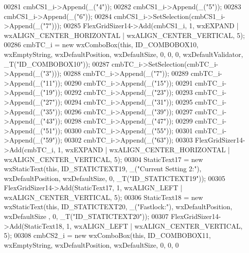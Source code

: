 \begin{DoxyCode}
00281     cmbCS1\_i->Append(\_(\textcolor{stringliteral}{"4"}));
00282     cmbCS1\_i->Append(\_(\textcolor{stringliteral}{"5"}));
00283     cmbCS1\_i->Append(\_(\textcolor{stringliteral}{"6"}));
00284     cmbCS1\_i->SetSelection(cmbCS1\_i->Append(\_(\textcolor{stringliteral}{"7"})));
00285     FlexGridSizer14->Add(cmbCS1\_i, 1, wxEXPAND | wxALIGN\_CENTER\_HORIZONTAL | wxALIGN\_CENTER\_VERTICAL, 5);
00286     cmbTC\_i = \textcolor{keyword}{new} wxComboBox(\textcolor{keyword}{this}, ID\_COMBOBOX10, wxEmptyString, wxDefaultPosition, wxDefaultSize, 0, 0, 0,
       wxDefaultValidator, _T(\textcolor{stringliteral}{"ID\_COMBOBOX10"}));
00287     cmbTC\_i->SetSelection(cmbTC\_i->Append(\_(\textcolor{stringliteral}{"3"})));
00288     cmbTC\_i->Append(\_(\textcolor{stringliteral}{"7"}));
00289     cmbTC\_i->Append(\_(\textcolor{stringliteral}{"11"}));
00290     cmbTC\_i->Append(\_(\textcolor{stringliteral}{"15"}));
00291     cmbTC\_i->Append(\_(\textcolor{stringliteral}{"19"}));
00292     cmbTC\_i->Append(\_(\textcolor{stringliteral}{"23"}));
00293     cmbTC\_i->Append(\_(\textcolor{stringliteral}{"27"}));
00294     cmbTC\_i->Append(\_(\textcolor{stringliteral}{"31"}));
00295     cmbTC\_i->Append(\_(\textcolor{stringliteral}{"35"}));
00296     cmbTC\_i->Append(\_(\textcolor{stringliteral}{"39"}));
00297     cmbTC\_i->Append(\_(\textcolor{stringliteral}{"43"}));
00298     cmbTC\_i->Append(\_(\textcolor{stringliteral}{"47"}));
00299     cmbTC\_i->Append(\_(\textcolor{stringliteral}{"51"}));
00300     cmbTC\_i->Append(\_(\textcolor{stringliteral}{"55"}));
00301     cmbTC\_i->Append(\_(\textcolor{stringliteral}{"59"}));
00302     cmbTC\_i->Append(\_(\textcolor{stringliteral}{"63"}));
00303     FlexGridSizer14->Add(cmbTC\_i, 1, wxEXPAND | wxALIGN\_CENTER\_HORIZONTAL | wxALIGN\_CENTER\_VERTICAL, 5);
00304     StaticText17 = \textcolor{keyword}{new} wxStaticText(\textcolor{keyword}{this}, ID\_STATICTEXT19, \_(\textcolor{stringliteral}{"Current Setting 2:"}), wxDefaultPosition, 
      wxDefaultSize, 0, _T(\textcolor{stringliteral}{"ID\_STATICTEXT19"}));
00305     FlexGridSizer14->Add(StaticText17, 1, wxALIGN\_LEFT | wxALIGN\_CENTER\_VERTICAL, 5);
00306     StaticText18 = \textcolor{keyword}{new} wxStaticText(\textcolor{keyword}{this}, ID\_STATICTEXT20, \_(\textcolor{stringliteral}{"Fastlock:"}), wxDefaultPosition, wxDefaultSize
      , 0, _T(\textcolor{stringliteral}{"ID\_STATICTEXT20"}));
00307     FlexGridSizer14->Add(StaticText18, 1, wxALIGN\_LEFT | wxALIGN\_CENTER\_VERTICAL, 5);
00308     cmbCS2\_i = \textcolor{keyword}{new} wxComboBox(\textcolor{keyword}{this}, ID\_COMBOBOX11, wxEmptyString, wxDefaultPosition, wxDefaultSize, 0, 0, 0

\end{DoxyCode}
